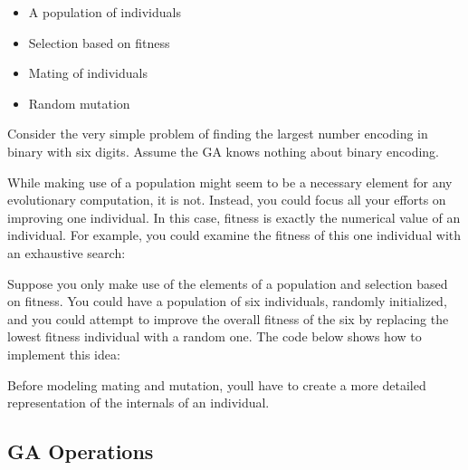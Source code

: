 \begin{itemize}
\item A population of individuals
\item Selection based on fitness
\item Mating of individuals
\item Random mutation
\end{itemize}
Consider the very simple problem of finding the largest number encoding
in binary with six digits. Assume the GA knows nothing about binary
encoding.

While making use of a population might seem to be a necessary element
for any evolutionary computation, it is not. Instead, you could focus
all your efforts on improving one individual. In this case, fitness is
exactly the numerical value of an individual. For example, you could
examine the fitness of this one individual with an exhaustive search:


Suppose you only make use of the elements of a population and selection
based on fitness. You could have a population of six individuals,
randomly initialized, and you could attempt to improve the overall
fitness of the six by replacing the lowest fitness individual with a
random one. The code below shows how to implement this idea:


Before modeling mating and mutation, you{\textquotesingle}ll have to
create a more detailed representation of the internals of an
individual.

\subsection{GA Operations}

